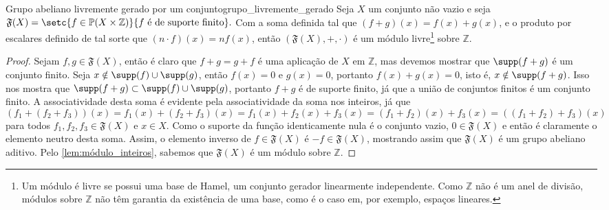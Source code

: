 \begin{proposition}{Grupo abeliano livremente gerado por um conjunto}{grupo_livremente_gerado}
    Seja \(X\) um conjunto não vazio e seja \(\mathfrak{F}(X) = \setc{f \in \mathbb{P}(X \times \mathbb{Z})}{f\text{ é de suporte finito}}.\) Com a soma definida tal que \((f+g)(x) = f(x) + g(x)\), e o produto por escalares definido de tal sorte que \((n\cdot f)(x) = n f(x)\), então \(\left(\mathfrak{F}(X), +, \cdot\right)\) é um módulo livre\footnote{Um módulo é livre se possui uma base de Hamel, um conjunto gerador linearmente independente. Como \(\mathbb{Z}\) não é um anel de divisão, módulos sobre \(\mathbb{Z}\) não têm garantia da existência de uma base, como é o caso em, por exemplo, espaços lineares.} sobre \(\mathbb{Z}\).
\end{proposition}
\begin{proof}
    Sejam \(f, g \in \mathfrak{F}(X)\), então é claro que \(f+g= g+ f\) é uma aplicação de \(X\) em \(\mathbb{Z}\), mas devemos mostrar que \(\supp(f+g)\) é um conjunto finito. Seja \(x \notin \supp(f) \cup \supp(g)\), então \(f(x) = 0\) e \(g(x) = 0\), portanto \(f(x) + g(x) = 0\), isto é, \(x \notin \supp(f + g)\). Isso nos mostra que \(\supp(f+g) \subset \supp(f) \cup \supp(g)\), portanto \(f+g\) é de suporte finito, já que a união de conjuntos finitos é um conjunto finito. A associatividade desta soma é evidente pela associatividade da soma nos inteiros, já que
    \begin{equation*}
        (f_1 + (f_2 + f_3))(x) = f_1(x) + (f_2 + f_3)(x) = f_1(x) + f_2(x) + f_3(x) = (f_1 + f_2)(x) + f_3(x) = ((f_1 + f_2) + f_3)(x)
    \end{equation*}
    para todos \(f_1, f_2, f_3 \in \mathfrak{F}(X)\) e \(x \in X\). Como o suporte da função identicamente nula é o conjunto vazio, \(0 \in \mathfrak{F}(X)\) e então é claramente o elemento neutro desta soma. Assim, o elemento inverso de \(f \in \mathfrak{F}(X)\) é \(-f \in \mathfrak{F}(X)\), mostrando assim que \(\mathfrak{F}(X)\) é um grupo abeliano aditivo. Pelo \cref{lem:módulo_inteiros}, sabemos que \(\mathfrak{F}(X)\) é um módulo sobre \(\mathbb{Z}\).


\end{proof}
